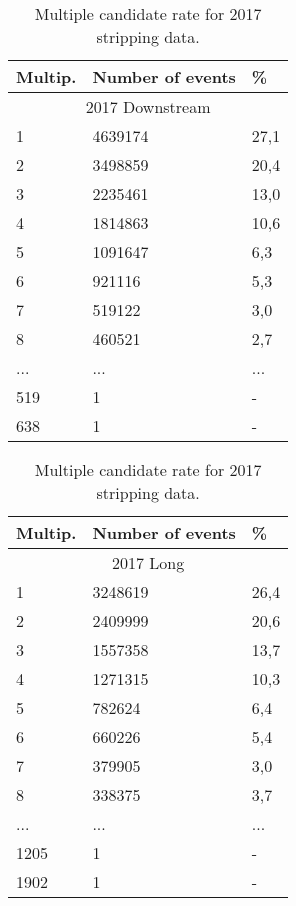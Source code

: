 \begin{table}[h!]
\begin{center}
\begin{tabular}{ p{2.6cm}p{3.1cm}p{0.6cm} }
\hline
\hline
Multip.  & Number of events & \% \\
\hline
    \multicolumn{3}{c}{2017 Downstream}\\
\hline

     1    & 4639174	& 27,1 \\
     2    & 3498859	& 20,4 \\
     3    & 2235461	& 13,0 \\
     4    & 1814863	& 10,6 \\
     5    & 1091647	& 6,3 \\
     6    & 921116	& 5,3 \\
     7    & 519122	& 3,0 \\
     8    & 460521	& 2,7 \\
    ...   &   ...  &  ... \\
    519  &    1 & -   \\
    638  &    1 & -   \\

\hline
\end{tabular}
\quad
\begin{tabular}{ p{2.6cm}p{3.1cm}p{0.6cm} }
\hline
\hline
Multip.  & Number of events & \% \\
\hline
    \multicolumn{3}{c}{2017 Long}\\
\hline
     1    & 3248619	& 26,4 \\
     2    & 2409999	& 20,6 \\
     3    & 1557358	& 13,7 \\
     4    & 1271315	& 10,3 \\
     5    & 782624	& 6,4 \\
     6    & 660226	& 5,4 \\
     7    & 379905	& 3,0 \\
     8    & 338375	& 3,7 \\
    ...   &   ...  &  ... \\
    1205  &    1 & -   \\
    1902  &    1 & -    \\     

     
\hline
\end{tabular}
\caption{Multiple candidate rate for 2017 stripping data.}
\label{tab:multi2017raw}
\end{center}
\end{table}%




